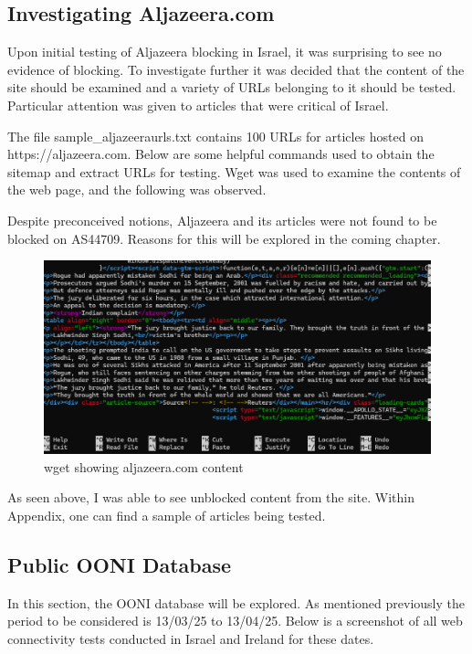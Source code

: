 \subsection{Investigating Aljazeera.com}
Upon initial testing of Aljazeera blocking in Israel, it was surprising to see no evidence of blocking. To investigate further it was decided that the content of the site should be examined and a variety of URLs belonging to it should be tested. Particular attention was given to articles that were critical of Israel.

The file sample\_aljazeeraurls.txt contains 100 URLs for articles hosted on https://aljazeera.com. Below are some helpful commands used to obtain the sitemap and extract URLs for testing. Wget was used to examine the contents of the web page, and the following was observed.

Despite preconceived notions, Aljazeera and its articles were not found to be blocked on AS44709. Reasons for this will be explored in the coming chapter.

\begin{figure} [H]
    \centering
    \includegraphics[width=1\linewidth]{wgetAljazeera.png}
    \caption{wget showing aljazeera.com content}
    \label{fig:enter-label}
\end{figure}


As seen above, I was able to see unblocked content from the site. Within Appendix, one can find a sample of articles being tested. 

\subsection{Public OONI Database}
In this section, the OONI database will be explored. As mentioned previously the period to be considered is 13/03/25 to 13/04/25. Below is a screenshot of all web connectivity tests conducted in Israel and Ireland for these dates. 

